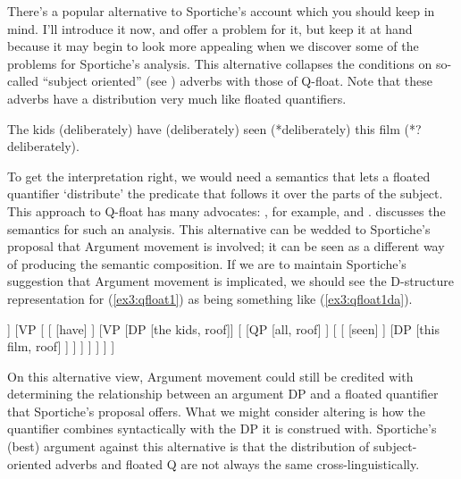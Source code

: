 There's a popular alternative to Sportiche's account which you should keep in mind. I'll introduce it now, and offer a problem for it, but keep it at hand because it may begin to look more appealing when we discover some of the problems for Sportiche's analysis. This alternative collapses the conditions on so-called ``subject oriented'' (see \citealt{Jackendoff:1972}) adverbs with those of Q-float. Note that these adverbs have a distribution very much like floated quantifiers.
\begin{fullwidth}
\begin{exe}
	\vspace*{\baselineskip}
	\ex \label{ex3:44} The kids (deliberately) have (deliberately) seen (*deliberately) this film (*?deliberately).
	\vspace*{\baselineskip}
\end{exe}
	\end{fullwidth}
To get the interpretation right, we would need a semantics that lets a floated quantifier `distribute' the predicate that follows it over the parts of the subject. This approach to Q-float has many advocates: \citet{Bowers:1993}, for example, and \citet{Kayne:1975}. \citet[chapter 3]{Roberts:1987} discusses the semantics for such an analysis. This alternative can be wedded to Sportiche's proposal that Argument movement is involved; it can be seen as a different way of producing the semantic composition. If we are to maintain Sportiche's suggestion that Argument movement is implicated, we should see the D-structure representation for (\ref{ex3:qfloat1}) as being something like (\ref{ex3:qfloat1da}).
\begin{exe}
\ex \label{ex3:qfloat1da} 
\small
\begin{forest}
[\ibar{I}
	[\obar{I} [pres]]
	[VP [
		[ [have] ]
		[VP
			[DP [the kids, roof]]
			[
				[QP [all, roof] ]
				[
					[ [seen] ]
					[DP [this film, roof] ]
				 ]
			 ]
		 ]
	] ]
]
\end{forest}
\end{exe}
On this alternative view, Argument movement could still be credited with determining the relationship between an argument DP and a floated quantifier that Sportiche's proposal offers. What we might consider altering is how the quantifier combines syntactically with the DP it is construed with. Sportiche's (best) argument against this alternative is that the distribution of subject-oriented adverbs and floated Q are not always the same cross-linguistically.

